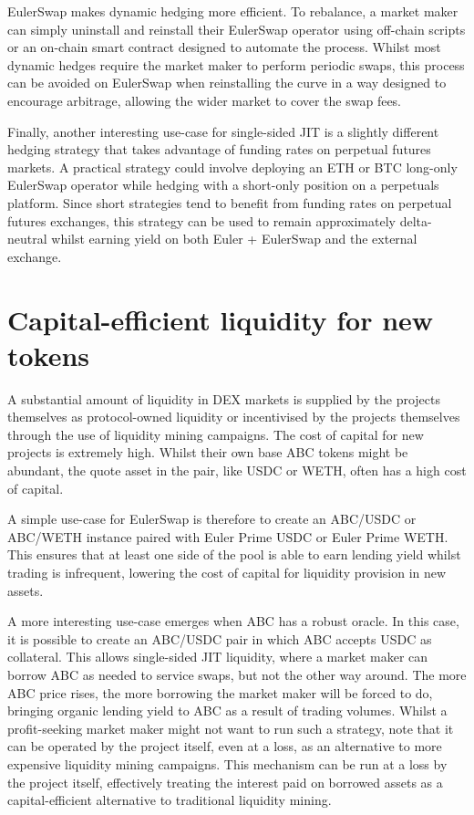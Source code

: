 \documentclass{article}
\begin{document}
EulerSwap makes dynamic hedging more efficient. To rebalance, a market maker can simply uninstall and reinstall their EulerSwap operator using off-chain scripts or an on-chain smart contract designed to automate the process. Whilst most dynamic hedges require the market maker to perform periodic swaps, this process can be avoided on EulerSwap when reinstalling the curve in a way designed to encourage arbitrage, allowing the wider market to cover the swap fees.

Finally, another interesting use-case for single-sided JIT is a slightly different hedging strategy that takes advantage of funding rates on perpetual futures markets. A practical strategy could involve deploying an ETH or BTC long-only EulerSwap operator while hedging with a short-only position on a perpetuals platform. Since short strategies tend to benefit from funding rates on perpetual futures exchanges, this strategy can be used to remain approximately delta-neutral whilst earning yield on both Euler + EulerSwap and the external exchange.

\section{Capital-efficient liquidity for new tokens}

A substantial amount of liquidity in DEX markets is supplied by the projects themselves as protocol-owned liquidity or incentivised by the projects themselves through the use of liquidity mining campaigns. The cost of capital for new projects is extremely high. Whilst their own base ABC tokens might be abundant, the quote asset in the pair, like USDC or WETH, often has a high cost of capital. 

A simple use-case for EulerSwap is therefore to create an ABC/USDC or ABC/WETH instance paired with Euler Prime USDC or Euler Prime WETH. This ensures that at least one side of the pool is able to earn lending yield whilst trading is infrequent, lowering the cost of capital for liquidity provision in new assets. 

A more interesting use-case emerges when ABC has a robust oracle. In this case, it is possible to create an ABC/USDC pair in which ABC accepts USDC as collateral. This allows single-sided JIT liquidity, where a market maker can borrow ABC as needed to service swaps, but not the other way around. The more ABC price rises, the more borrowing the market maker will be forced to do, bringing organic lending yield to ABC as a result of trading volumes. Whilst a profit-seeking market maker might not want to run such a strategy, note that it can be operated by the project itself, even at a loss, as an alternative to more expensive liquidity mining campaigns. This mechanism can be run at a loss by the project itself, effectively treating the interest paid on borrowed assets as a capital-efficient alternative to traditional liquidity mining.
\end{document}
